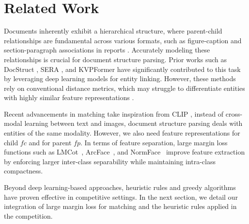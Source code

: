 \section{Related Work}\label{sec:related}
Documents inherently exhibit a hierarchical structure, where parent-child relationships are fundamental across various formats, such as figure-caption and section-paragraph associations in reports \cite{ding2024deep}. Accurately modeling these relationships is crucial for document structure parsing. Prior works such as DocStruct \cite{wang2020docstruct}, SERA \cite{zhang2021entity}, and KVPFormer \cite{hu2023question} have significantly contributed to this task by leveraging deep learning models for entity linking. However, these methods rely on conventional distance metrics, which may struggle to differentiate entities with highly similar feature representations \cite{duong2025scalable}.

Recent advancements in matching take inspiration from CLIP \cite{radford2021learning}, instead of cross-modal learning between text and images, document structure parsing deals with entities of the same modality. However, we also need feature representations for child $fc$ and for parent $fp$. In terms of feature separation, large margin loss functions such as LMCot~\cite{duong2022large}, ArcFace~\cite{deng2019arcface}, and NormFace~\cite{wang2017normface} improve feature extraction by enforcing larger inter-class separability while maintaining intra-class compactness.

Beyond deep learning-based approaches, heuristic rules and greedy algorithms have proven effective in competitive settings\cite{duong2025addressing}. In the next section, we detail our integration of large margin loss for matching and the heuristic rules applied in the competition.  